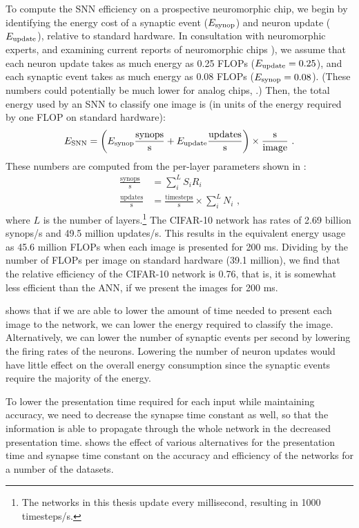 To compute the SNN efficiency on a prospective neuromorphic chip,
we begin by identifying the energy cost
of a synaptic event ($E_\text{synop}$) and neuron update ($E_\text{update}$),
relative to standard hardware.
In consultation with neuromorphic experts,
and examining current reports of neuromorphic chips \parencite[\eg/][]{Merolla2014}),
we assume that
each neuron update takes as much energy as 0.25 FLOPs ($E_\text{update} = 0.25$),
and each synaptic event takes as much energy as 0.08 FLOPs ($E_\text{synop} = 0.08$).
(These numbers could potentially be much lower for analog chips, \textcite[\eg/][]{Benjamin2014}.)
Then, the total energy used by an SNN to classify one image is
(in units of the energy required by one FLOP on standard hardware):
\begin{align}
  \Esnn = \left(\Esynop \frac{\text{synops}}{\text{s}} +
            \Eupdate \frac{\text{updates}}{\text{s}}\right) \times
            \frac{\text{s}}{\text{image}} \text{ .}
  \eqnlabel{esnn}
\end{align}
These numbers are computed from the per-layer parameters
shown in :
\begin{align}
  \frac{\text{synops}}{\text{s}} &= \sum_i^L S_i R_i \nonumber\\
  \frac{\text{updates}}{\text{s}} &= \frac{\text{timesteps}}{\text{s}} \times \sum_i^L N_i \nonumber
  \text{ ,}
\end{align}
where $L$ is the number of layers.\footnote{
  The networks in this thesis update every millisecond,
  resulting in 1000 timesteps/s.}
The CIFAR-10 network has rates of
2.69 billion synops/s and 49.5 million updates/s.
This results in the equivalent energy usage as 45.6 million FLOPs
when each image is presented for 200 ms.
Dividing by the number of FLOPs per image on standard hardware (39.1 million),
we find that the relative efficiency of the CIFAR-10 network is 0.76,
that is, it is somewhat less efficient than the ANN,
if we present the images for 200 ms.

 shows that if we are able to lower
the amount of time needed to present each image to the network,
we can lower the energy required to classify the image.
Alternatively, we can lower the number of synaptic events per second
by lowering the firing rates of the neurons.
Lowering the number of neuron updates would have little effect on the
overall energy consumption since the synaptic events require the majority of the energy.

To lower the presentation time required for each input while maintaining accuracy,
we need to decrease the synapse time constant as well,
so that the information is able to propagate through the whole network
in the decreased presentation time.
 shows the effect of various alternatives
for the presentation time and synapse time constant
on the accuracy and efficiency of the networks for a number of the datasets.

